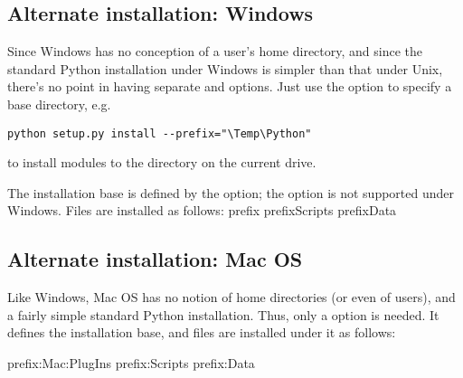 \documentclass{howto}
\begin{document}
\subsection{Alternate installation: Windows}
\label{sec:alt-windows}

Since Windows has no conception of a user's home directory, and since
the standard Python installation under Windows is simpler than that
under Unix, there's no point in having separate  and
 options.  Just use the  option to specify
a base directory, e.g.
\begin{verbatim}
python setup.py install --prefix="\Temp\Python"
\end{verbatim}
to install modules to the  directory on the current
drive.

The installation base is defined by the  option; the
 option is not supported under Windows.  Files are
installed as follows:
              {prefix}{}
              {prefix}{\bslash{}Scripts}
              {prefix}{\bslash{}Data}


\subsection{Alternate installation: Mac OS}
\label{sec:alt-macos}

Like Windows, Mac OS has no notion of home directories (or even of
users), and a fairly simple standard Python installation.  Thus, only a
 option is needed.  It defines the installation base, and 
files are installed under it as follows:


              {prefix}{:Mac:PlugIns}
              {prefix}{:Scripts}
              {prefix}{:Data}

\end{document}
